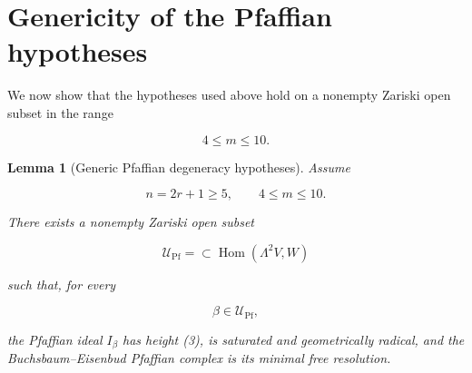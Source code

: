 \documentclass[11pt]{article}
\newtheorem{lemma}[theorem]{Lemma}
\begin{document}
\section{Genericity of the Pfaffian hypotheses}

We now show that the hypotheses used above hold on a nonempty Zariski open subset in the range

\[
4\le m\le10.
\]

\begin{lemma}[Generic Pfaffian degeneracy hypotheses]

Assume

\[
n=2r+1\ge5,
\qquad
4\le m\le10.
\]

There exists a nonempty Zariski open subset

\[
\mathcal U_{\mathrm{Pf}}
=
\subset
\operatorname{Hom}(\Lambda^2V,W)
\]

such that, for every

\[
\beta\in\mathcal U_{\mathrm{Pf}},
\]

the Pfaffian ideal $I_\beta$ has height (3), is saturated and geometrically radical, and the Buchsbaum--Eisenbud Pfaffian complex is its minimal free resolution.

\end{lemma}
\end{document}
